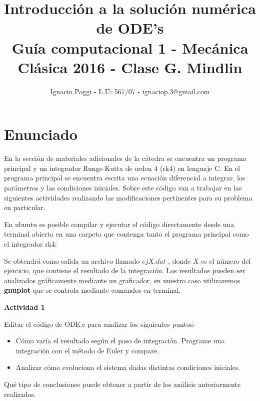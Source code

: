 \documentclass[a4paper,12pt]{article}
\begin{document}
 

\title{Introducci\'on a la soluci\'on num\'erica de ODE's \\
\large Gu\'ia computacional 1 - Mec\'anica Cl\'asica 2016 - Clase G. Mindlin}
\author{Ignacio Poggi - L.U: 567/07 - ignaciop.3@gmail.com}
\maketitle



\section{Enunciado}

En la secci\'on de materiales adicionales de la c\'atedra se encuentra un programa principal y un integrador Runge-Kutta de orden 4 (rk4) en lenguaje C. En el programa principal se encuentra escrita una ecuaci\'on diferencial a integrar, los par\'ametros y las condiciones iniciales. Sobre este c\'odigo van a trabajar en las siguientes actividades realizando las modificaciones pertinentes para su problema en particular.

En ubuntu es posible compilar y ejecutar el c\'odigo directamente desde una terminal abierta en una carpeta que contenga tanto el programa principal como el integrador rk4:\newline


\newline

Se obtendr\'a como salida un archivo llamado $ejX.dat$ , donde $X$ es el n\'umero del ejercicio, que contiene el resultado de la integraci\'on. Los resultados pueden ser analizados gr\'aficamente mediante un graficador, en nuestro caso utilizaremos \textbf{gnuplot} que se controla mediante comandos en terminal.\newline


{\Large \textbf{Actividad 1}}

Editar el c\'odigo de ODE.c para analizar los siguientes puntos:

\begin{itemize}
\item C\'omo var\'ia el resultado seg\'un el paso de integraci\'on. Programe una integraci\'on con el m\'etodo de Euler y compare.
\item Analizar c\'omo evoluciona el sistema dadas distintas condiciones iniciales.
\end{itemize}
Qu\'e tipo de conclusiones puede obtener a partir de los an\'alisis anteriormente realizados.\newline
\end{document}
